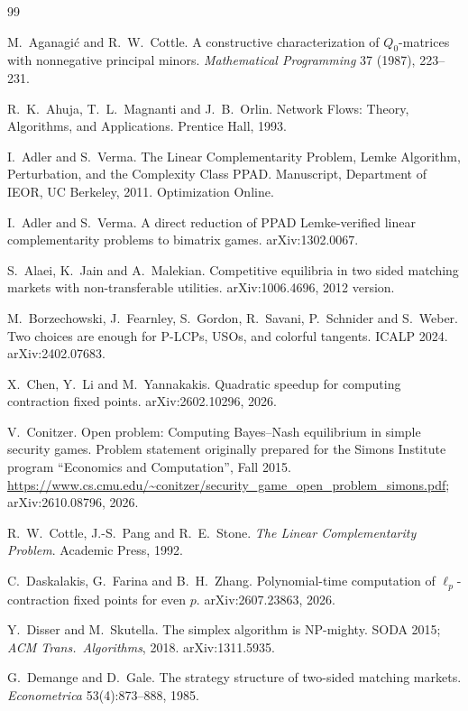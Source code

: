 \small
\begin{thebibliography}{99}

 M.~Aganagi\'c and R.~W.~Cottle. A constructive characterization of $Q_0$-matrices with
nonnegative principal minors. \emph{Mathematical Programming} 37 (1987), 223--231.

 R.~K.~Ahuja, T.~L.~Magnanti and J.~B.~Orlin. Network Flows: Theory, Algorithms, and Applications. Prentice Hall, 1993.

 I.~Adler and S.~Verma. The Linear Complementarity Problem, Lemke Algorithm, Perturbation, and the Complexity Class PPAD. Manuscript, Department of IEOR, UC Berkeley, 2011. Optimization Online.

 I.~Adler and S.~Verma. A direct reduction of PPAD Lemke-verified linear complementarity
problems to bimatrix games. arXiv:1302.0067.

 S.~Alaei, K.~Jain and A.~Malekian. Competitive equilibria in two sided matching
markets with non-transferable utilities. arXiv:1006.4696, 2012 version.

 M.~Borzechowski, J.~Fearnley, S.~Gordon, R.~Savani, P.~Schnider and S.~Weber. Two choices are enough for P-LCPs, USOs, and colorful tangents. ICALP 2024. arXiv:2402.07683.

 X.~Chen, Y.~Li and M.~Yannakakis. Quadratic speedup for computing contraction fixed
points. arXiv:2602.10296, 2026.

 V.~Conitzer. Open problem: Computing Bayes--Nash equilibrium in simple security
games. Problem statement originally prepared for the Simons Institute program ``Economics and
Computation'', Fall 2015.
\url{https://www.cs.cmu.edu/~conitzer/security_game_open_problem_simons.pdf}; arXiv:2610.08796, 2026.

 R.~W.~Cottle, J.-S.~Pang and R.~E.~Stone. \emph{The Linear Complementarity Problem}.
Academic Press, 1992.

 C.~Daskalakis, G.~Farina and B.~H.~Zhang. Polynomial-time computation of
$\ell_p$-contraction fixed points for even $p$. arXiv:2607.23863, 2026.

 Y.~Disser and M.~Skutella. The simplex algorithm is NP-mighty. SODA 2015; \emph{ACM
Trans.\ Algorithms}, 2018. arXiv:1311.5935.

 G.~Demange and D.~Gale. The strategy structure of two-sided matching markets. \emph{Econometrica} 53(4):873--888, 1985.


\end{thebibliography}
